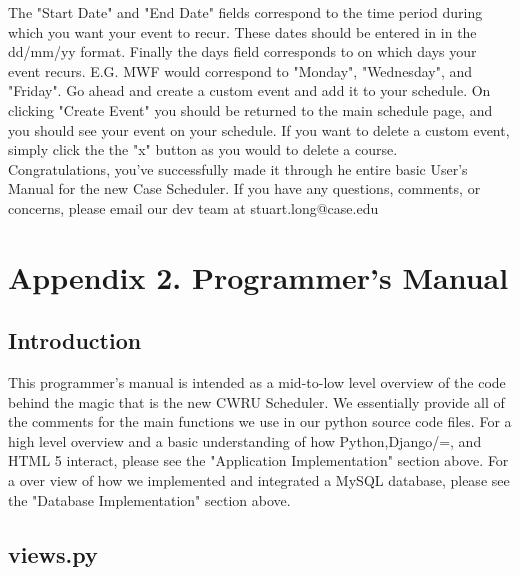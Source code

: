 \documentclass[pdftex,12pt,letter]{article}
\begin{document}
The "Start Date" and "End Date" fields correspond to the time period during which you want your event to recur. These dates should be entered in in the dd/mm/yy format. Finally the days field corresponds to on which days your event recurs. E.G. MWF would correspond to "Monday", "Wednesday", and "Friday". Go ahead and create a custom event and add it to your schedule. On clicking "Create Event" you should be returned to the main schedule page, and you should see your event on your schedule. If you want to delete a custom event, simply click the the "x" button as you would to delete a course.\\

Congratulations, you've successfully made it through he entire basic User's Manual for the new Case Scheduler. If you have any questions, comments, or concerns, please email our dev team at stuart.long@case.edu

\section{Appendix 2. Programmer's Manual}
\subsection{Introduction}
This programmer's manual is intended as a mid-to-low level overview of the code behind the magic that is the new CWRU Scheduler. We essentially provide all of the comments for the main functions we use in our python source code files. For a high level overview and a basic understanding of how Python,Django/=, and HTML 5 interact, please see the "Application Implementation" section above. For a over view of how we implemented and integrated a MySQL database, please see the "Database Implementation" section above.
\subsection{views.py}

\end{document}
